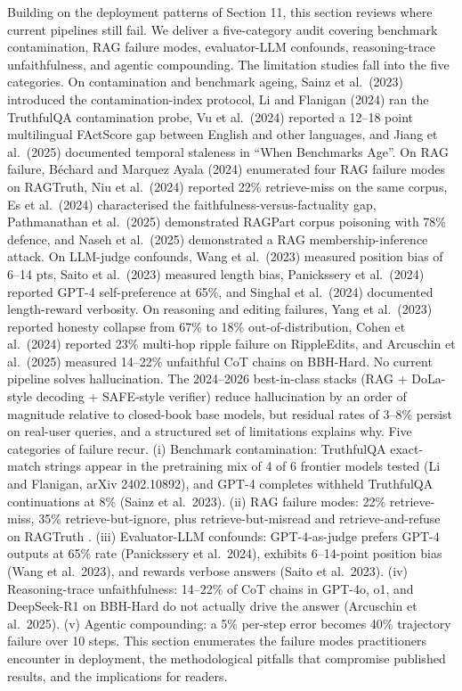 \documentclass{article}
\begin{document}
Building on the deployment patterns of Section 11, this section reviews where current pipelines still fail. We deliver a five-category audit covering benchmark contamination, RAG failure modes, evaluator-LLM confounds, reasoning-trace unfaithfulness, and agentic compounding. The limitation studies fall into the five categories. On contamination and benchmark ageing, Sainz et al.~(2023) introduced the contamination-index protocol, Li and Flanigan (2024) ran the TruthfulQA contamination probe, Vu et al.~(2024) reported a 12--18 point multilingual FActScore gap between English and other languages, and Jiang et al.~(2025) documented temporal staleness in ``When Benchmarks Age''. On RAG failure, Béchard and Marquez Ayala (2024) enumerated four RAG failure modes on RAGTruth, Niu et al.~(2024) reported 22\% retrieve-miss on the same corpus, Es et al.~(2024) characterised the faithfulness-versus-factuality gap, Pathmanathan et al.~(2025) demonstrated RAGPart corpus poisoning with 78\% defence, and Naseh et al.~(2025) demonstrated a RAG membership-inference attack. On LLM-judge confounds, Wang et al.~(2023) measured position bias of 6--14 pts, Saito et al.~(2023) measured length bias, Panickssery et al.~(2024) reported GPT-4 self-preference at 65\%, and Singhal et al.~(2024) documented length-reward verbosity. On reasoning and editing failures, Yang et al.~(2023) reported honesty collapse from 67\% to 18\% out-of-distribution, Cohen et al.~(2024) reported 23\% multi-hop ripple failure on RippleEdits, and Arcuschin et al.~(2025) measured 14--22\% unfaithful CoT chains on BBH-Hard. No current pipeline solves hallucination. The 2024--2026 best-in-class stacks (RAG + DoLa-style decoding + SAFE-style verifier) reduce hallucination by an order of magnitude relative to closed-book base models, but residual rates of 3--8\% persist on real-user queries, and a structured set of limitations explains why. Five categories of failure recur. (i) Benchmark contamination: TruthfulQA exact-match strings appear in the pretraining mix of 4 of 6 frontier models tested (Li and Flanigan, arXiv 2402.10892), and GPT-4 completes withheld TruthfulQA continuations at 8\% (Sainz et al.~2023). (ii) RAG failure modes: 22\% retrieve-miss, 35\% retrieve-but-ignore, plus retrieve-but-misread and retrieve-and-refuse on RAGTruth \citep{bchard2024reducinghallucinat}. (iii) Evaluator-LLM confounds: GPT-4-as-judge prefers GPT-4 outputs at 65\% rate (Panickssery et al.~2024), exhibits 6--14-point position bias (Wang et al.~2023), and rewards verbose answers (Saito et al.~2023). (iv) Reasoning-trace unfaithfulness: 14--22\% of CoT chains in GPT-4o, o1, and DeepSeek-R1 on BBH-Hard do not actually drive the answer (Arcuschin et al.~2025). (v) Agentic compounding: a 5\% per-step error becomes 40\% trajectory failure over 10 steps. This section enumerates the failure modes practitioners encounter in deployment, the methodological pitfalls that compromise published results, and the implications for readers.
\end{document}
